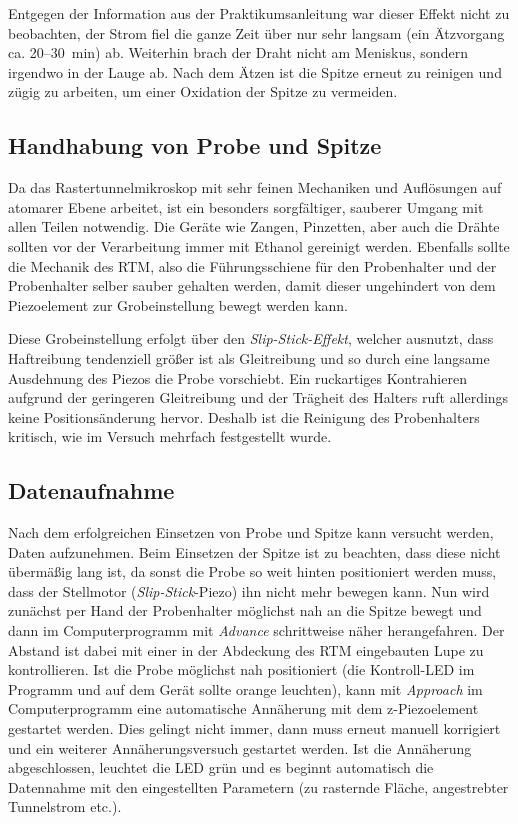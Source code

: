 \documentclass[10pt, a4paper]{article}
\begin{document}
Entgegen der Information aus der Praktikumsanleitung war dieser Effekt nicht zu beobachten, der Strom fiel die ganze Zeit über nur sehr langsam (ein Ätzvorgang ca. \num{20}--\SI{30}{\minute}) ab.
Weiterhin brach der Draht nicht am Meniskus, sondern irgendwo in der Lauge ab.  
Nach dem Ätzen ist die Spitze erneut zu reinigen und zügig zu arbeiten, um einer Oxidation der Spitze zu vermeiden.

\subsection{Handhabung von Probe und Spitze}

Da das Rastertunnelmikroskop mit sehr feinen Mechaniken und Auflösungen auf atomarer Ebene arbeitet, ist ein besonders sorgfältiger, sauberer Umgang mit allen Teilen notwendig.
Die Geräte wie Zangen, Pinzetten, aber auch die Drähte sollten vor der Verarbeitung immer mit Ethanol gereinigt werden.
Ebenfalls sollte die Mechanik des RTM, also die Führungsschiene für den Probenhalter und der Probenhalter selber sauber gehalten werden, damit dieser ungehindert von dem Piezoelement zur Grobeinstellung bewegt werden kann.

Diese Grobeinstellung erfolgt über den \emph{Slip-Stick-Effekt}, welcher ausnutzt, dass Haftreibung tendenziell größer ist als Gleitreibung und so durch eine langsame Ausdehnung des Piezos die Probe vorschiebt.
Ein ruckartiges Kontrahieren aufgrund der geringeren Gleitreibung und der Trägheit des Halters ruft allerdings keine Positionsänderung hervor.
Deshalb ist die Reinigung des Probenhalters kritisch, wie im Versuch mehrfach festgestellt wurde.

\subsection{Datenaufnahme}

Nach dem erfolgreichen Einsetzen von Probe und Spitze kann versucht werden, Daten aufzunehmen.
Beim Einsetzen der Spitze ist zu beachten, dass diese nicht übermäßig lang ist, da sonst die Probe so weit hinten positioniert werden muss, dass der Stellmotor (\emph{Slip-Stick}-Piezo) ihn nicht mehr bewegen kann.
Nun wird zunächst per Hand der Probenhalter möglichst nah an die Spitze bewegt und dann im Computerprogramm mit \textit{Advance} schrittweise näher herangefahren.
Der Abstand ist dabei mit einer in der Abdeckung des RTM eingebauten Lupe zu kontrollieren.
Ist die Probe möglichst nah positioniert (die Kontroll-LED im Programm und auf dem Gerät sollte orange leuchten), kann mit \textit{Approach} im Computerprogramm eine automatische Annäherung mit dem z-Piezoelement gestartet werden.
Dies gelingt nicht immer, dann muss erneut manuell korrigiert und ein weiterer Annäherungsversuch gestartet werden.
Ist die Annäherung abgeschlossen, leuchtet die LED grün und es beginnt automatisch die Datennahme mit den eingestellten Parametern (zu rasternde Fläche, angestrebter Tunnelstrom etc.).
\end{document}
